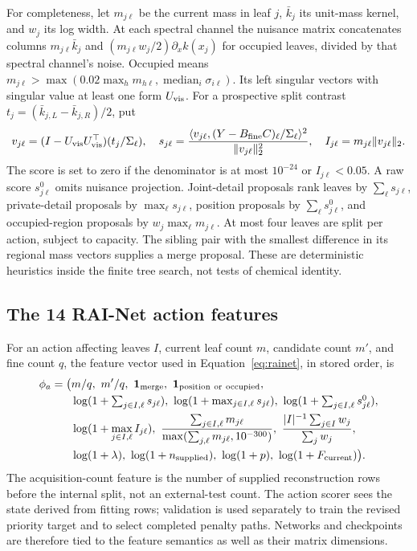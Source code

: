For completeness, let $m_{j\ell}$ be the current mass in leaf $j$, $\bar k_j$ its unit-mass kernel, and $w_j$ its log width. At each spectral channel the nuisance matrix concatenates columns $m_{j\ell}\bar k_j$ and $(m_{j\ell}w_j/2)\partial_x k(x_j)$ for occupied leaves, divided by that spectral channel's noise. Occupied means $m_{j\ell}>\max(0.02\max_hm_{h\ell},\operatorname{median}_i\sigma_{i\ell})$. Its left singular vectors with singular value at least one form $U_{\rm vis}$. For a prospective split contrast $t_j=(\bar k_{j,L}-\bar k_{j,R})/2$, put
\begin{equation}\label{eq:haarscore}
 v_{j\ell}=(I-U_{\rm vis}U_{\rm vis}^\top)(t_j/\Sigma_\ell),\quad
 s_{j\ell}=\frac{\langle v_{j\ell},(Y-B_{\rm fine}C)_\ell/\Sigma_\ell\rangle^2}
 {\|v_{j\ell}\|_2^2},\quad I_{j\ell}=m_{j\ell}\|v_{j\ell}\|_2.
\end{equation}
The score is set to zero if the denominator is at most $10^{-24}$ or $I_{j\ell}<0.05$. A raw score $s^0_{j\ell}$ omits nuisance projection. Joint-detail proposals rank leaves by $\sum_\ell s_{j\ell}$, private-detail proposals by $\max_\ell s_{j\ell}$, position proposals by $\sum_\ell s^0_{j\ell}$, and occupied-region proposals by $w_j\max_\ell m_{j\ell}$. At most four leaves are split per action, subject to capacity. The sibling pair with the smallest difference in its regional mass vectors supplies a merge proposal. These are deterministic heuristics inside the finite tree search, not tests of chemical identity.

\subsection{The 14 RAI-Net action features}\label{app:netfeatures}
For an action affecting leaves $I$, current leaf count $m$, candidate count $m'$, and fine count $q$, the feature vector used in Equation~\eqref{eq:rainet}, in stored order, is
\begin{align}\label{eq:netfeatures}
 \phi_a=\big(&m/q,\ m'/q,\ \one_{\rm merge},\ \one_{\rm position\ or\ occupied},\nonumber\\
 &\log(1+\textstyle\sum_{j\in I,\ell}s_{j\ell}),\
 \log(1+\max_{j\in I,\ell}s_{j\ell}),\
 \log(1+\textstyle\sum_{j\in I,\ell}s^0_{j\ell}),\nonumber\\
 &\log(1+\max_{j\in I,\ell}I_{j\ell}),\
 \frac{\sum_{j\in I,\ell}m_{j\ell}}{\max(\sum_{j,\ell}m_{j\ell},10^{-300})},\
 \frac{|I|^{-1}\sum_{j\in I}w_j}{\sum_jw_j},\nonumber\\
 &\log(1+\lambda),\ \log(1+n_{\rm supplied}),\ \log(1+p),\ \log(1+F_{\rm current})\big).
\end{align}
The acquisition-count feature is the number of supplied reconstruction rows before the internal split, not an external-test count. The action scorer sees the state derived from fitting rows; validation is used separately to train the revised priority target and to select completed penalty paths. Networks and checkpoints are therefore tied to the feature semantics as well as their matrix dimensions.


